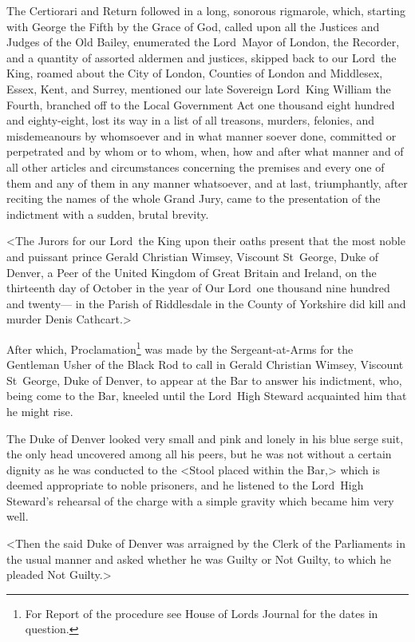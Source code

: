 The Certiorari and Return followed in a long, sonorous rigmarole, which, starting with George the Fifth by the Grace of God, called upon all the Justices and Judges of the Old Bailey, enumerated the Lord~Mayor of London, the Recorder, and a quantity of assorted aldermen and justices, skipped back to our Lord~the King, roamed about the City of London, Counties of London and Middlesex, Essex, Kent, and Surrey, mentioned our late Sovereign Lord~King William the Fourth, branched off to the Local Government Act one thousand eight hundred and eighty-eight, lost its way in a list of all treasons, murders, felonies, and misdemeanours by whomsoever and in what manner soever done, committed or perpetrated and by whom or to whom, when, how and after what manner and of all other articles and circumstances concerning the premises and every one of them and any of them in any manner whatsoever, and at last, triumphantly, after reciting the names of the whole Grand Jury, came to the presentation of the indictment with a sudden, brutal brevity.

<The Jurors for our Lord~the King upon their oaths present that the most noble and puissant prince Gerald Christian Wimsey, Viscount St~George, Duke of Denver, a Peer of the United Kingdom of Great Britain and Ireland, on the thirteenth day of October in the year of Our Lord~one thousand nine hundred and twenty— in the Parish of Riddlesdale in the County of Yorkshire did kill and murder Denis Cathcart.>

After which, Proclamation\footnote{For Report of the procedure see House of Lords Journal for the dates in question.} was made by the Sergeant-at-Arms for the Gentleman Usher of the Black Rod to call in Gerald Christian Wimsey, Viscount St~George, Duke of Denver, to appear at the Bar to answer his indictment, who, being come to the Bar, kneeled until the Lord~High Steward acquainted him that he might rise.

The Duke of Denver looked very small and pink and lonely in his blue serge suit, the only head uncovered among all his peers, but he was not without a certain dignity as he was conducted to the <Stool placed within the Bar,> which is deemed appropriate to noble prisoners, and he listened to the Lord~High Steward's rehearsal of the charge with a simple gravity which became him very well.

<Then the said Duke of Denver was arraigned by the Clerk of the Parliaments in the usual manner and asked whether he was Guilty or Not Guilty, to which he pleaded Not Guilty.>

